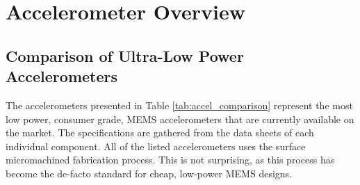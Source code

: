 \chapter{Accelerometer Overview}

\section{Comparison of Ultra-Low Power Accelerometers}

The accelerometers presented in Table \ref{tab:accel_comparison} represent the most low power, consumer grade, MEMS accelerometers that are currently available on the market. The specifications are gathered from the data sheets of each individual component. All of the listed accelerometers uses the surface micromachined fabrication process. This is not surprising, as this process has become the de-facto standard for cheap, low-power MEMS designs.  

